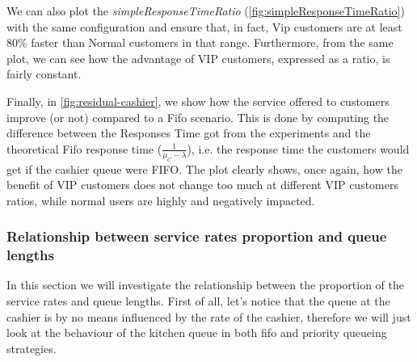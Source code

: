 We can also plot the \emph{simpleResponseTimeRatio} (\cref{fig:simpleResponseTimeRatio}) with the same configuration and ensure that, in fact, Vip customers are at least 80\% faster than Normal customers in that range. Furthermore, from the same plot, we can see how the advantage of VIP customers, expressed as a ratio, is fairly constant.

Finally, in \cref{fig:residual-cashier}, we show how the service offered to customers improve (or not) compared to a Fifo scenario. This is done by computing the difference between the Responses Time got from the experiments and the theoretical Fifo response time ($\frac{1}{\mu_C-\lambda}$), i.e. the response time the customers would get if the cashier queue were FIFO. The plot clearly shows, once again, how the benefit of VIP customers does not change too much at different VIP customers ratios, while normal users are highly and negatively impacted.

\subsubsection{Relationship between service rates proportion and queue lengths}
\label{sec:cashier_no_infl}

In this section we will investigate the relationship between the proportion of the service rates and queue lengths. First of all, let's notice that the queue at the cashier is by no means influenced by the rate of the cashier, therefore we will just look at the behaviour of the kitchen queue in both fifo and priority queueing strategies.

